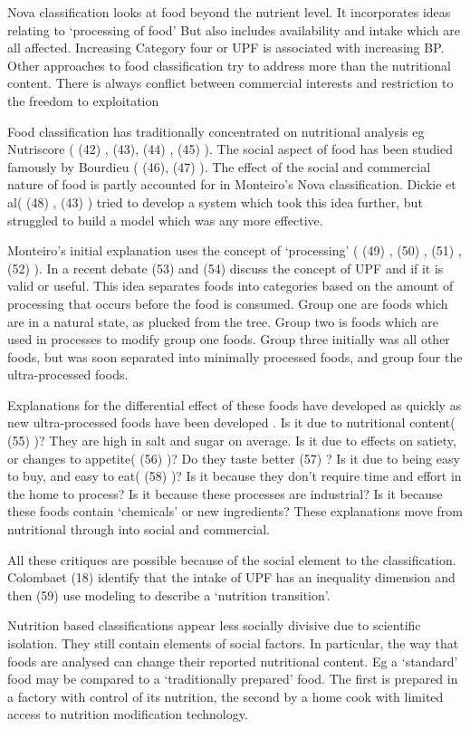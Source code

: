 \documentclass[
]{article}
\begin{document}
Nova classification looks at food beyond the nutrient level. It
incorporates ideas relating to `processing of food' But also includes
availability and intake which are all affected. Increasing Category four
or UPF is associated with increasing BP. Other approaches to food
classification try to address more than the nutritional content. There
is always conflict between commercial interests and restriction to the
freedom to exploitation

Food classification has traditionally concentrated on nutritional
analysis eg Nutriscore ( (42) , (43), (44) , (45) ). The social aspect
of food has been studied famously by Bourdieu ( (46), (47) ). The effect
of the social and commercial nature of food is partly accounted for in
Monteiro's Nova classification. Dickie et al( (48) , (43) ) tried to
develop a system which took this idea further, but struggled to build a
model which was any more effective.

Monteiro's initial explanation uses the concept of `processing' ( (49) ,
(50) , (51) , (52) ). In a recent debate (53) and (54) discuss the
concept of UPF and if it is valid or useful. This idea separates foods
into categories based on the amount of processing that occurs before the
food is consumed. Group one are foods which are in a natural state, as
plucked from the tree. Group two is foods which are used in processes to
modify group one foods. Group three initially was all other foods, but
was soon separated into minimally processed foods, and group four the
ultra-processed foods.

Explanations for the differential effect of these foods have developed
as quickly as new ultra-processed foods have been developed . Is it due
to nutritional content( (55) )? They are high in salt and sugar on
average. Is it due to effects on satiety, or changes to appetite( (56)
)? Do they taste better (57) ? Is it due to being easy to buy, and easy
to eat( (58) )? Is it because they don't require time and effort in the
home to process? Is it because these processes are industrial? Is it
because these foods contain `chemicals' or new ingredients? These
explanations move from nutritional through into social and commercial.

All these critiques are possible because of the social element to the
classification. Colombaet (18) identify that the intake of UPF has an
inequality dimension and then (59) use modeling to describe a `nutrition
transition'.

Nutrition based classifications appear less socially divisive due to
scientific isolation. They still contain elements of social factors. In
particular, the way that foods are analysed can change their reported
nutritional content. Eg a `standard' food may be compared to a
`traditionally prepared' food. The first is prepared in a factory with
control of its nutrition, the second by a home cook with limited access
to nutrition modification technology.
\end{document}
